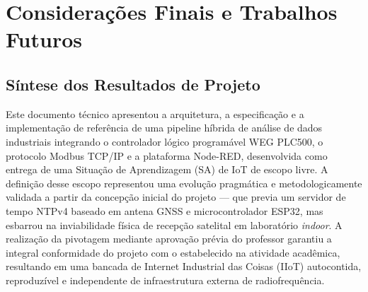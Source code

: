 
\chapter{Considerações Finais e Trabalhos Futuros}
\label{cap:consideracoes}

\section{Síntese dos Resultados de Projeto}
\label{sec:cons_sintese}

Este documento técnico apresentou a arquitetura, a especificação e a implementação de referência de uma pipeline híbrida de análise de dados industriais integrando o controlador lógico programável WEG PLC500, o protocolo Modbus TCP/IP e a plataforma Node-RED, desenvolvida como entrega de uma Situação de Aprendizagem (SA) de IoT de escopo livre. A definição desse escopo representou uma evolução pragmática e metodologicamente validada a partir da concepção inicial do projeto --- que previa um servidor de tempo NTPv4 baseado em antena GNSS e microcontrolador ESP32, mas esbarrou na inviabilidade física de recepção satelital em laboratório \textit{indoor}. A realização da pivotagem mediante aprovação prévia do professor garantiu a integral conformidade do projeto com o estabelecido na atividade acadêmica, resultando em uma bancada de Internet Industrial das Coisas (IIoT) autocontida, reproduzível e independente de infraestrutura externa de radiofrequência.

